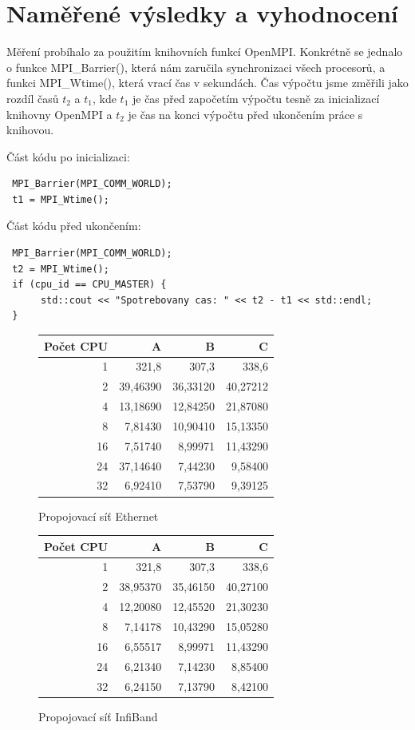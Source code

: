 \documentclass[12pt]{article}
\begin{document}

\section{Naměřené výsledky a vyhodnocení}
Měření probíhalo za použitím knihovních funkcí OpenMPI. Konkrétně se jednalo o funkce MPI\_Barrier(), 
která nám zaručila synchronizaci všech procesorů, a funkci MPI\_Wtime(), která vrací čas v sekundách.
Čas výpočtu jsme změřili jako rozdíl časů \(t_2\) a \(t_1\), kde \(t_1\) je čas před započetím výpočtu
tesně za inicializací knihovny OpenMPI a \(t_2\) je čas na konci výpočtu před ukončením práce s knihovou.

Část kódu po inicializaci:
\begin{verbatim}
 MPI_Barrier(MPI_COMM_WORLD);
 t1 = MPI_Wtime();
\end{verbatim}
Část kódu před ukončením:
\begin{verbatim}
 MPI_Barrier(MPI_COMM_WORLD);
 t2 = MPI_Wtime();
 if (cpu_id == CPU_MASTER) {
      std::cout << "Spotrebovany cas: " << t2 - t1 << std::endl;
 }
\end{verbatim}

\begin{figure}
\caption{Propojovací síť Ethernet}
\begin{tabular}{|r|r|r|r|}
\hline
Počet CPU & A & B & C\\
\hline
1 & 321,8 & 307,3 & 338,6\\
\hline
2 & 39,46390 & 36,33120 & 40,27212\\
\hline
4 & 13,18690 & 12,84250 & 21,87080\\
\hline
8 & 7,81430 & 10,90410 & 15,13350\\
\hline
16 & 7,51740 & 8,99971 & 11,43290\\
\hline
24 & 37,14640 & 7,44230 & 9,58400\\
\hline
32 & 6,92410 & 7,53790 & 9,39125\\
\hline
\end{tabular} 
\end{figure}

\begin{figure}
 \caption{Propojovací síť InfiBand}
\begin{tabular}{|r|r|r|r|}
\hline
Počet CPU & A & B & C\\
\hline
1 & 321,8 & 307,3 & 338,6\\
\hline
2 & 38,95370 & 35,46150 & 40,27100\\
\hline
4 & 12,20080 & 12,45520 & 21,30230\\
\hline
8 & 7,14178 & 10,43290 & 15,05280\\
\hline
16 & 6,55517 & 8,99971 & 11,43290\\
\hline
24 & 6,21340 & 7,14230 & 8,85400\\
\hline
32 & 6,24150 & 7,13790 & 8,42100\\
\hline
\end{tabular} 
\end{figure}
\end{document}
